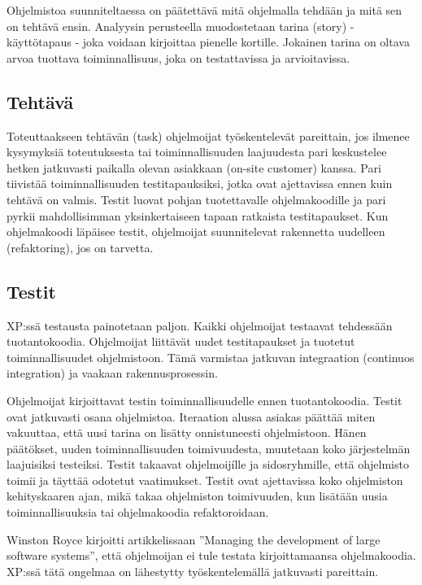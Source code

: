 \documentclass[finnish]{tktltiki2}
\theoremstyle{definition}
\theoremstyle{remark}
\begin{document}
Ohjelmistoa suunniteltaessa on päätettävä mitä ohjelmalla tehdään ja mitä sen on tehtävä ensin. Analyysin perusteella muodostetaan tarina (story) - käyttötapaus - joka voidaan kirjoittaa pienelle kortille. Jokainen tarina on oltava arvoa tuottava toiminnallisuus, joka on testattavissa ja arvioitavissa\cite{BEC99}.

\subsection*{Tehtävä}

Toteuttaakseen tehtävän (task) ohjelmoijat työskentelevät pareittain, jos ilmenee kysymyksiä toteutuksesta tai toiminnallisuuden laajuudesta pari keskustelee hetken jatkuvasti paikalla olevan asiakkaan (on-site customer) kanssa. Pari tiivistää toiminnallisuuden testitapauksiksi, jotka ovat ajettavissa ennen kuin tehtävä on valmis. Testit luovat pohjan tuotettavalle ohjelmakoodille ja pari pyrkii mahdollisimman yksinkertaiseen tapaan ratkaista testitapaukset. Kun ohjelmakoodi läpäisee testit, ohjelmoijat suunnitelevat rakennetta uudelleen (refaktoring), jos on tarvetta\cite{BEC99}.     

\subsection*{Testit}

XP:ssä testausta painotetaan paljon. Kaikki ohjelmoijat testaavat tehdessään tuotantokoodia. Ohjelmoijat liittävät uudet testitapaukset ja tuotetut toiminnallisuudet ohjelmistoon. Tämä varmistaa jatkuvan integraation (continuos integration) ja vaakaan rakennusprosessin\cite{FOW01a}.

Ohjelmoijat kirjoittavat testin toiminnallisuudelle ennen tuotantokoodia. Testit ovat jatkuvasti osana ohjelmistoa. Iteraation alussa asiakas päättää miten vakuuttaa, että uusi tarina on lisätty onnistuneesti ohjelmistoon. Hänen päätökset, uuden toiminnallisuuden toimivuudesta, muutetaan koko järjestelmän laajuisiksi testeiksi. Testit takaavat ohjelmoijílle ja sidosryhmille, että ohjelmisto toimii ja täyttää odotetut vaatimukset. Testit ovat ajettavissa koko ohjelmiston kehityskaaren ajan, mikä takaa ohjelmiston toimivuuden, kun lisätään uusia toiminnallisuuksia tai ohjelmakoodia refaktoroidaan\cite{BEC99}.

Winston Royce kirjoitti artikkelissaan ''Managing the development of large software systems'', että ohjelmoijan ei tule testata kirjoittamaansa ohjelmakoodia. XP:ssä tätä ongelmaa on lähestytty työskentelemällä jatkuvasti pareittain\cite{BEC99}.
\end{document}
